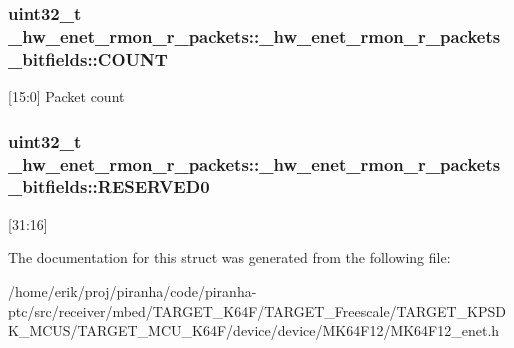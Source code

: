 \subsubsection[{\texorpdfstring{C\+O\+U\+NT}{COUNT}}]{\setlength{\rightskip}{0pt plus 5cm}uint32\+\_\+t \+\_\+hw\+\_\+enet\+\_\+rmon\+\_\+r\+\_\+packets\+::\+\_\+hw\+\_\+enet\+\_\+rmon\+\_\+r\+\_\+packets\+\_\+bitfields\+::\+C\+O\+U\+NT}\hypertarget{struct__hw__enet__rmon__r__packets_1_1__hw__enet__rmon__r__packets__bitfields_a99983f8a295ece71faae0a6f553ffeae}{}\label{struct__hw__enet__rmon__r__packets_1_1__hw__enet__rmon__r__packets__bitfields_a99983f8a295ece71faae0a6f553ffeae}
\mbox{[}15\+:0\mbox{]} Packet count 
\subsubsection[{\texorpdfstring{R\+E\+S\+E\+R\+V\+E\+D0}{RESERVED0}}]{\setlength{\rightskip}{0pt plus 5cm}uint32\+\_\+t \+\_\+hw\+\_\+enet\+\_\+rmon\+\_\+r\+\_\+packets\+::\+\_\+hw\+\_\+enet\+\_\+rmon\+\_\+r\+\_\+packets\+\_\+bitfields\+::\+R\+E\+S\+E\+R\+V\+E\+D0}\hypertarget{struct__hw__enet__rmon__r__packets_1_1__hw__enet__rmon__r__packets__bitfields_a875f8c6beee32a86df8040c1336f3a3f}{}\label{struct__hw__enet__rmon__r__packets_1_1__hw__enet__rmon__r__packets__bitfields_a875f8c6beee32a86df8040c1336f3a3f}
\mbox{[}31\+:16\mbox{]} 

The documentation for this struct was generated from the following file\+:\begin{DoxyCompactItemize}
\item 
/home/erik/proj/piranha/code/piranha-\/ptc/src/receiver/mbed/\+T\+A\+R\+G\+E\+T\+\_\+\+K64\+F/\+T\+A\+R\+G\+E\+T\+\_\+\+Freescale/\+T\+A\+R\+G\+E\+T\+\_\+\+K\+P\+S\+D\+K\+\_\+\+M\+C\+U\+S/\+T\+A\+R\+G\+E\+T\+\_\+\+M\+C\+U\+\_\+\+K64\+F/device/device/\+M\+K64\+F12/M\+K64\+F12\+\_\+enet.\+h\end{DoxyCompactItemize}
